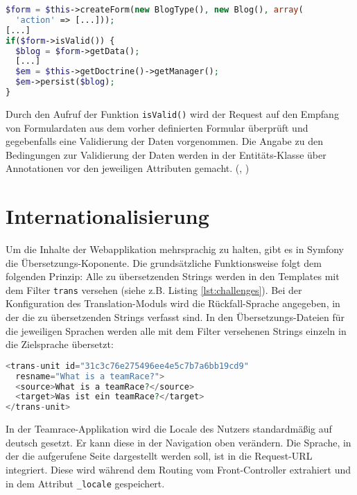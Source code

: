 \documentclass[12pt]{report}
\begin{document}
\begin{lstlisting}[language=php, caption=Auszug aus \\src/TeamRace/WebBundle/Controller/TeamraceController.php, showstringspaces=false]
$form = $this->createForm(new BlogType(), new Blog(), array(
  'action' => [...]));
[...]		 
if($form->isValid()) {
  $blog = $form->getData();
  [...]
  $em = $this->getDoctrine()->getManager();
  $em->persist($blog);
}
\end{lstlisting}
Durch den Aufruf der Funktion \texttt{isValid()} wird der Request auf den Empfang von Formulardaten aus dem vorher definierten Formular überprüft und gegebenfalls eine Validierung der Daten vorgenommen. Die Angabe zu den Bedingungen zur Validierung der Daten werden in der Entitäts-Klasse über Annotationen vor den jeweiligen Attributen gemacht. (\cite{sf2:Forms}, \cite{sf2:FormComponent})

\section{Internationalisierung}
\label{sec:Internationalisierung}
Um die Inhalte der Webapplikation mehrsprachig zu halten, gibt es in Symfony die Übersetzungs-Koponente. Die grundsätzliche Funktionsweise folgt dem folgenden Prinzip: Alle zu übersetzenden Strings werden in den Templates mit dem Filter \texttt{trans} versehen (siehe z.B. Listing \ref{lst:challenges}). Bei der Konfiguration des Translation-Moduls wird die Rückfall-Sprache angegeben, in der die zu übersetzenden Strings verfasst sind. In den Übersetzungs-Dateien für die jeweiligen Sprachen werden alle mit dem Filter versehenen Strings einzeln in die Zielsprache übersetzt:

\begin{lstlisting}[language=php, caption=Auszug aus \\src/TeamRace/WebBundle/Resources/translations/messages.de.xlf, showstringspaces=false]
<trans-unit id="31c3c76e275496ee4e5c7b7a6bb19cd9" 
  resname="What is a teamRace?">
  <source>What is a teamRace?</source>
  <target>Was ist ein teamRace?</target>
</trans-unit>
\end{lstlisting}

In der Teamrace-Applikation wird die Locale des Nutzers standardmäßig auf deutsch gesetzt. Er kann diese in der Navigation oben verändern. Die Sprache, in der die aufgerufene Seite dargestellt werden soll, ist in die Request-URL integriert. Diese wird während dem Routing vom Front-Controller extrahiert und in dem Attribut \texttt{\_locale} gespeichert. 
\end{document}
